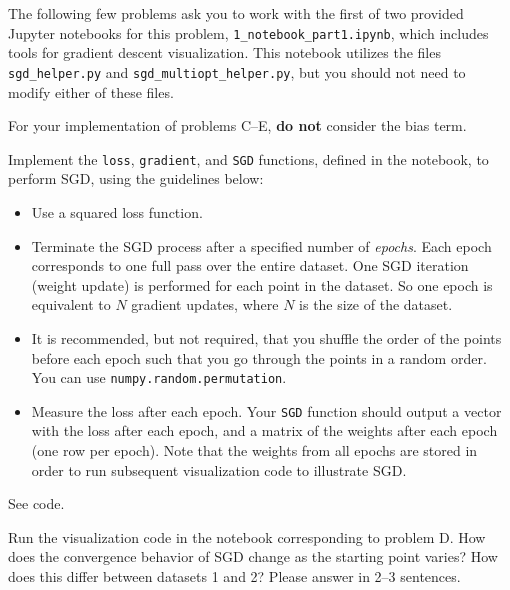 The following few problems ask you to work with the first of two provided Jupyter notebooks for this problem, \texttt{1_notebook_part1.ipynb}, which includes tools for gradient descent visualization.
This notebook utilizes the files \texttt{sgd_helper.py} and \texttt{sgd_multiopt_helper.py}, but you should not need to modify either of these files.

\newpage

For your implementation of problems C--E, \textbf{do not} consider the bias term.

\begin{problem}[8]
Implement the \texttt{loss}, \texttt{gradient}, and \texttt{SGD} functions, defined in the notebook, to perform SGD, using the guidelines below:

\begin{itemize}
	\item Use a squared loss function.
	\item Terminate the SGD process after a specified number of \emph{epochs}.
	      Each epoch corresponds to one full pass over the entire dataset.
	      One SGD iteration (weight update) is performed for each point in the dataset.
	      So one epoch is equivalent to $N$ gradient updates, where $N$ is the size of the dataset.
	\item It is recommended, but not required, that you shuffle the order of the points before each epoch such that you go through the points in a random order.
	      You can use \texttt{numpy.random.permutation}.
	\item Measure the loss after each epoch.
	      Your \texttt{SGD} function should output a vector with the loss after each epoch, and a matrix of the weights after each epoch (one row per epoch).
	      Note that the weights from all epochs are stored in order to run subsequent visualization code to illustrate SGD.
\end{itemize}
\end{problem}
\begin{solution}
	See code. %
\end{solution}

\begin{problem}[2]
Run the visualization code in the notebook corresponding to problem D.
How does the convergence behavior of SGD change as the starting point varies?
How does this differ between datasets 1 and 2?
Please answer in 2--3 sentences.
\end{problem}
\begin{solution}

\end{solution}

